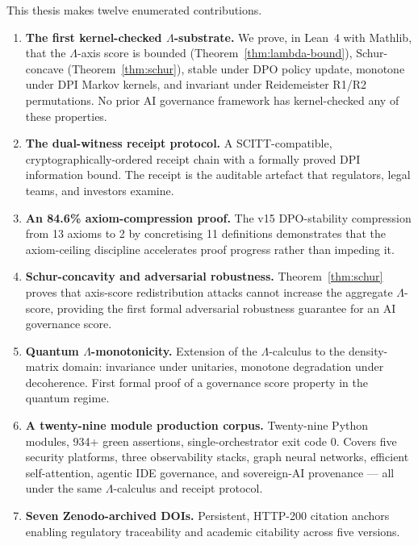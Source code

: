 This thesis makes twelve enumerated contributions.

\begin{enumerate}

  \item \textbf{The first kernel-checked \(\Lambda\)-substrate.}
    We prove, in Lean~4 with Mathlib, that the \(\Lambda\)-axis score
    is bounded (Theorem~\ref{thm:lambda-bound}), Schur-concave
    (Theorem~\ref{thm:schur}), stable under DPO policy update,
    monotone under DPI Markov kernels, and invariant under Reidemeister
    R1/R2 permutations.
    No prior AI governance framework has kernel-checked any of these
    properties.

  \item \textbf{The dual-witness receipt protocol.}
    A SCITT-compatible, cryptographically-ordered receipt chain with a
    formally proved DPI information bound.
    The receipt is the auditable artefact that regulators, legal teams,
    and investors examine.

  \item \textbf{An 84.6\% axiom-compression proof.}
    The v15 DPO-stability compression from 13 axioms to 2 by concretising
    11 definitions demonstrates that the axiom-ceiling discipline
    accelerates proof progress rather than impeding it.

  \item \textbf{Schur-concavity and adversarial robustness.}
    Theorem~\ref{thm:schur} proves that axis-score redistribution attacks
    cannot increase the aggregate \(\Lambda\)-score, providing the first
    formal adversarial robustness guarantee for an AI governance score.

  \item \textbf{Quantum \(\Lambda\)-monotonicity.}
    Extension of the \(\Lambda\)-calculus to the density-matrix domain:
    invariance under unitaries, monotone degradation under decoherence.
    First formal proof of a governance score property in the quantum regime.

  \item \textbf{A twenty-nine module production corpus.}
    Twenty-nine Python modules, 934+ green assertions, single-orchestrator
    exit code 0.
    Covers five security platforms, three observability stacks, graph
    neural networks, efficient self-attention, agentic IDE governance,
    and sovereign-AI provenance --- all under the same \(\Lambda\)-calculus
    and receipt protocol.

  \item \textbf{Seven Zenodo-archived DOIs.}
    Persistent, HTTP-200 citation anchors enabling regulatory traceability
    and academic citability across five versions.


\end{enumerate}

